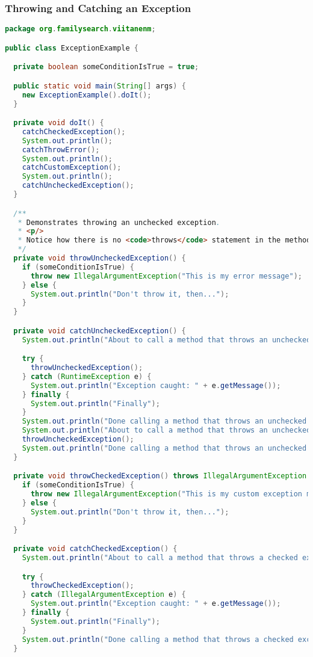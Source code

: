 \subsubsection{Throwing and Catching an Exception}\label{App:AppendixHThrowCatch}
\begin{lstlisting}[language=Java]
package org.familysearch.viitanenm;

public class ExceptionExample {

  private boolean someConditionIsTrue = true;

  public static void main(String[] args) {
    new ExceptionExample().doIt();
  }

  private void doIt() {
    catchCheckedException();
    System.out.println();
    catchThrowError();
    System.out.println();
    catchCustomException();
    System.out.println();
    catchUncheckedException();
  }

  /**
   * Demonstrates throwing an unchecked exception.
   * <p/>
   * Notice how there is no <code>throws</code> statement in the method signature
   */
  private void throwUncheckedException() {
    if (someConditionIsTrue) {
      throw new IllegalArgumentException("This is my error message");
    } else {
      System.out.println("Don't throw it, then...");
    }
  }

  private void catchUncheckedException() {
    System.out.println("About to call a method that throws an unchecked exception, handled");

    try {
      throwUncheckedException();
    } catch (RuntimeException e) {
      System.out.println("Exception caught: " + e.getMessage());
    } finally {
      System.out.println("Finally");
    }
    System.out.println("Done calling a method that throws an unchecked exception, handled");
    System.out.println("About to call a method that throws an unchecked exception, not handled");
    throwUncheckedException();
    System.out.println("Done calling a method that throws an unchecked exception, not handled");
  }

  private void throwCheckedException() throws IllegalArgumentException {
    if (someConditionIsTrue) {
      throw new IllegalArgumentException("This is my custom exception message");
    } else {
      System.out.println("Don't throw it, then...");
    }
  }

  private void catchCheckedException() {
    System.out.println("About to call a method that throws a checked exception, handled");

    try {
      throwCheckedException();
    } catch (IllegalArgumentException e) {
      System.out.println("Exception caught: " + e.getMessage());
    } finally {
      System.out.println("Finally");
    }
    System.out.println("Done calling a method that throws a checked exception, handled");
  }


\end{lstlisting}
